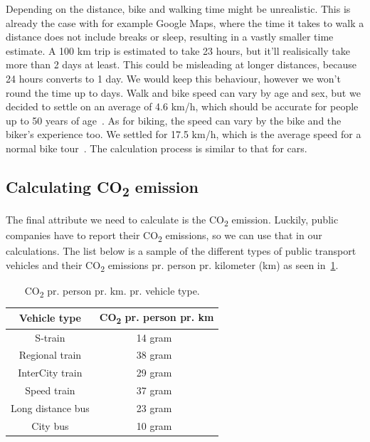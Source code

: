 Depending on the distance, bike and walking time might be unrealistic.
This is already the case with for example Google Maps, where the time it takes to walk a distance does not include
breaks or sleep, resulting in a vastly smaller time estimate.
A 100 km trip is estimated to take 23 hours, but it'll realisically take more than 2 days at least.
This could be misleading at longer distances, because 24 hours converts to 1 day.
We would keep this behaviour, however we won't round the time up to days.
Walk and bike speed can vary by age and sex, but we decided to settle on an average of 4.6 km/h, which should be
accurate for people up to 50 years of age~\cite{time_walk}.
As for biking, the speed can vary by the bike and the biker's experience too.
We settled for 17.5 km/h, which is the average speed for a normal bike tour~\cite{time_bike}.
The calculation process is similar to that for cars.

\subsection{Calculating \unit{CO_{2}} emission}\label{subsec:calculating-co2-emission}

The final attribute we need to calculate is the \unit{CO_{2}} emission.
Luckily, public companies have to report their \unit{CO_{2}} emissions, so we can use that in our calculations.
The list below is a sample of the different types of public transport vehicles and their \unit{CO_{2}} emissions pr.
person pr. kilometer (km) as seen in~\ref{tab:emissions}.

\begin{table}[H]
    \centering
    \begin{tabular}{ || c | c || }
        \hline
        Vehicle type & \unit{CO_{2}} pr. person pr. km \\
        \hline\hline
        S-train & 14 gram~\cite{dsb2023} \\
        \hline
        Regional train & 38 gram~\cite{dsb2023} \\
        \hline
        InterCity train & 29 gram~\cite{dsb2023} \\
        \hline
        Speed train & 37 gram~\cite{dsb2023} \\
        \hline
        Long distance bus & 23 gram~\cite{cowi2022} \\
        \hline
        City bus & 10 gram~\cite{ntm2023} \\
        \hline
    \end{tabular}
    \caption{\unit{CO_{2}} pr. person pr. km. pr. vehicle type.}
    \label{tab:emissions}
\end{table}

